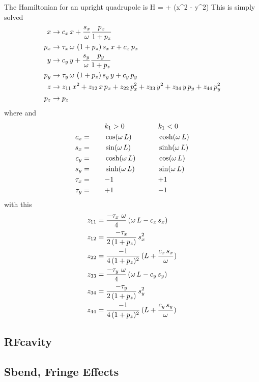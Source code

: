 \documentclass{book}
\begin{document}
The Hamiltonian for an upright quadrupole is
\Begineq
  H =  +  (x^2 - y^2)
\Endeq
This is simply solved
\begin{align}
  x   &\rightarrow c_x \, x + \frac{s_x}{\omega} \frac{p_x}{1 + p_z} \nonumber \\
  p_x &\rightarrow \tau_x \, \omega \, \, (1 + p_z) \, s_x \, x + c_x \, p_x \nonumber \\
  y   &\rightarrow c_y \, y + \frac{s_y}{\omega} \frac{p_y}{1 + p_z} \nonumber \\
  p_y &\rightarrow \tau_y \, \omega \, \, (1 + p_z) \, s_y \, y + c_y \, p_y \nonumber \\
  z   &\rightarrow z_{11} \, x^2 + z_{12} \, x \, p_x + z_{22} \, p_x^2 + 
                   z_{33} \, y^2 + z_{34} \, y \, p_y + z_{44} \, p_y^2 \nonumber \\
  p_z &\rightarrow p_z \nonumber
\end{align}
where 
\Begineq
  \om \equiv {}
\Endeq
and
\begin{alignat}{3}
         &\hspace*{5ex}  && k_1 > 0          &\hspace*{5ex}& k_1 < 0 \nonumber \\
     c_x &=   && \cos  (\omega \, L) && \cosh (\omega \, L) \nonumber \\
     s_x &=   && \sin  (\omega \, L) && \sinh (\omega \, L) \nonumber \\
     c_y &=   && \cosh (\omega \, L) && \cos  (\omega \, L) \\
     s_y &=   && \sinh (\omega \, L) && \sin  (\omega \, L) \nonumber \\
  \tau_x &=   && {-}1             && {+}1             \nonumber \\
  \tau_y &=   && {+}1             && {-}1             \nonumber
\end{alignat}
with this
\begin{align}
  z_{11} &= \frac{-\tau_x \,\, \omega}{4} \, (\omega \, L - c_x \, s_x) \nonumber \\
  z_{12} &= \frac{-\tau_x}{2 \, (1 + p_z)} \, s_x^2 \nonumber \\
  z_{22} &= \frac{-1}{4 \, (1 + p_z)^2} \, (L + \frac{c_x \, s_x}{\omega}) \nonumber \\
  z_{33} &= \frac{-\tau_y \,\, \omega}{4} \, (\omega \, L - c_y \, s_y) \nonumber \\
  z_{34} &= \frac{-\tau_y}{2 \, (1 + p_z)} \, s_y^2 \nonumber \\
  z_{44} &= \frac{-1}{4 \, (1 + p_z)^2} \, (L + \frac{c_y \, s_y}{\omega}) \nonumber
\end{align}


\subsection{RFcavity}

\subsection{Sbend, Fringe Effects}
\end{document}
